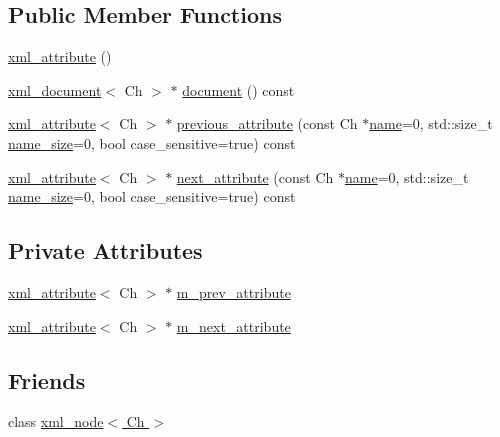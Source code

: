 \subsection*{Public Member Functions}
\begin{DoxyCompactItemize}
\item 
\hyperlink{singletonrapidxml_1_1xml__attribute_a26be291103917d3e8de110d46dd83816}{xml\+\_\+attribute} ()
\item 
\hyperlink{singletonrapidxml_1_1xml__document}{xml\+\_\+document}$<$ Ch $>$ $\ast$ \hyperlink{singletonrapidxml_1_1xml__attribute_a8b6d31d899e27f01bde35b53d98496ec}{document} () const 
\item 
\hyperlink{singletonrapidxml_1_1xml__attribute}{xml\+\_\+attribute}$<$ Ch $>$ $\ast$ \hyperlink{singletonrapidxml_1_1xml__attribute_ae3547cc30b201fd6d7b98c04dda26f89}{previous\+\_\+attribute} (const Ch $\ast$\hyperlink{classrapidxml_1_1xml__base_a9a09739310469995db078ebd0da3ed45}{name}=0, std\+::size\+\_\+t \hyperlink{classrapidxml_1_1xml__base_a7e7f98b3d01e1eab8dc1ca69aad9af84}{name\+\_\+size}=0, bool case\+\_\+sensitive=true) const 
\item 
\hyperlink{singletonrapidxml_1_1xml__attribute}{xml\+\_\+attribute}$<$ Ch $>$ $\ast$ \hyperlink{singletonrapidxml_1_1xml__attribute_a56c08d7c96203286c889a43849328a86}{next\+\_\+attribute} (const Ch $\ast$\hyperlink{classrapidxml_1_1xml__base_a9a09739310469995db078ebd0da3ed45}{name}=0, std\+::size\+\_\+t \hyperlink{classrapidxml_1_1xml__base_a7e7f98b3d01e1eab8dc1ca69aad9af84}{name\+\_\+size}=0, bool case\+\_\+sensitive=true) const 
\end{DoxyCompactItemize}
\subsection*{Private Attributes}
\begin{DoxyCompactItemize}
\item 
\hyperlink{singletonrapidxml_1_1xml__attribute}{xml\+\_\+attribute}$<$ Ch $>$ $\ast$ \hyperlink{singletonrapidxml_1_1xml__attribute_a204438287a5ad384405584726a1d8559}{m\+\_\+prev\+\_\+attribute}
\item 
\hyperlink{singletonrapidxml_1_1xml__attribute}{xml\+\_\+attribute}$<$ Ch $>$ $\ast$ \hyperlink{singletonrapidxml_1_1xml__attribute_a3254e4b040a9b71c6b6d1c27ec03352a}{m\+\_\+next\+\_\+attribute}
\end{DoxyCompactItemize}
\subsection*{Friends}
\begin{DoxyCompactItemize}
\item 
class \hyperlink{singletonrapidxml_1_1xml__attribute_aa7e464ce3fe512598ff8dda47291941f}{xml\+\_\+node$<$ Ch $>$}
\end{DoxyCompactItemize}
